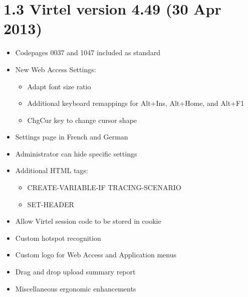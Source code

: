 \documentclass[letterpaper,10pt,english]{sphinxmanual}
\begin{document}
\section{1.3 Virtel version 4.49 (30 Apr 2013)}
\label{\detokenize{Installation_Guide:virtel-version-4-49-30-apr-2013}}
\begin{itemize}
\item {} 
Codepages 0037 and 1047 included as standard

\item {} 
New Web Access Settings:
\begin{itemize}
\item {} 
Adapt font size ratio

\item {} 
Additional keyboard remappings for Alt+Ins, Alt+Home, and Alt+F1

\item {} 
ChgCur key to change cursor shape

\end{itemize}

\item {} 
Settings page in French and German

\item {} 
Administrator can hide specific settings

\item {} 
Additional HTML tags:
\begin{itemize}
\item {} 
CREATE-VARIABLE-IF TRACING-SCENARIO

\item {} 
SET-HEADER

\end{itemize}

\item {} 
Allow Virtel session code to be stored in cookie

\item {} 
Custom hotspot recognition

\item {} 
Custom logo for Web Access and Application menus

\item {} 
Drag and drop upload summary report

\item {} 
Miscellaneous ergonomic enhancements

\end{itemize}
\end{document}
